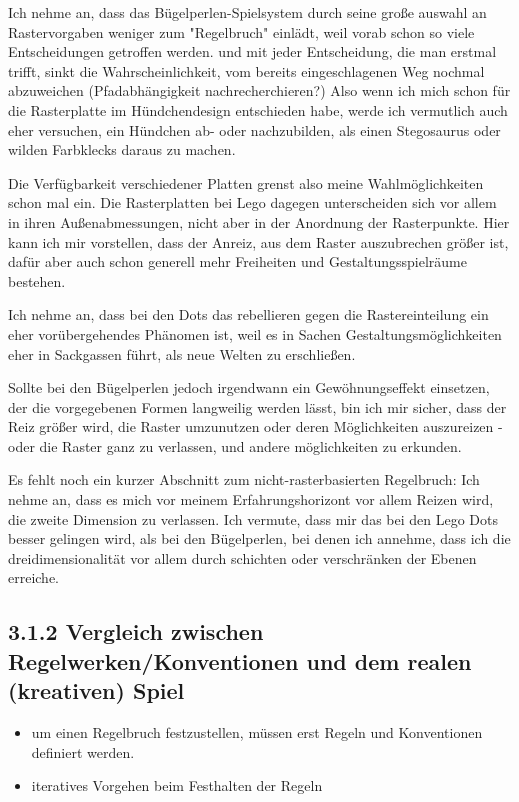 \documentclass[11pt,a4paper,twoside]{scrreprt}
\begin{document}
Ich nehme an, dass das Bügelperlen-Spielsystem durch seine große auswahl an Rastervorgaben weniger zum "Regelbruch" einlädt, weil vorab schon so viele Entscheidungen getroffen werden. und mit jeder Entscheidung, die man erstmal trifft, sinkt die Wahrscheinlichkeit, vom bereits eingeschlagenen Weg nochmal abzuweichen (Pfadabhängigkeit nachrecherchieren?)
Also wenn ich mich schon für die Rasterplatte im Hündchendesign entschieden habe, werde ich vermutlich auch eher versuchen, ein Hündchen ab- oder nachzubilden, als einen Stegosaurus oder wilden Farbklecks daraus zu machen.

Die Verfügbarkeit verschiedener Platten grenst also meine Wahlmöglichkeiten schon mal ein. Die Rasterplatten bei Lego dagegen unterscheiden sich vor allem in ihren Außenabmessungen, nicht aber in der Anordnung der Rasterpunkte. Hier kann ich mir vorstellen, dass der Anreiz, aus dem Raster auszubrechen größer ist, dafür aber auch schon generell mehr Freiheiten und Gestaltungsspielräume bestehen. 

Ich nehme an, dass bei den Dots das rebellieren gegen die Rastereinteilung ein eher vorübergehendes Phänomen ist, weil es in Sachen Gestaltungsmöglichkeiten eher in Sackgassen führt, als neue Welten zu erschließen.

Sollte bei den Bügelperlen jedoch irgendwann ein Gewöhnungseffekt einsetzen, der die vorgegebenen Formen langweilig werden lässt, bin ich mir sicher, dass der Reiz größer wird, die Raster umzunutzen oder deren Möglichkeiten auszureizen - oder die Raster ganz zu verlassen, und andere möglichkeiten zu erkunden.

Es fehlt noch ein kurzer Abschnitt zum nicht-rasterbasierten Regelbruch:
Ich nehme an, dass es mich vor meinem Erfahrungshorizont vor allem Reizen wird, die zweite Dimension zu verlassen. Ich vermute, dass mir das bei den Lego Dots besser gelingen wird, als bei den Bügelperlen, bei denen ich annehme, dass ich die dreidimensionalität vor allem durch schichten oder verschränken der Ebenen erreiche.

		\subsection{3.1.2 Vergleich zwischen Regelwerken/Konventionen und dem realen (kreativen) Spiel}
			\begin{itemize}
				\item um einen Regelbruch festzustellen, müssen erst Regeln und Konventionen definiert werden. 
				\item iteratives Vorgehen beim Festhalten der Regeln
			\end{itemize}
\end{document}
